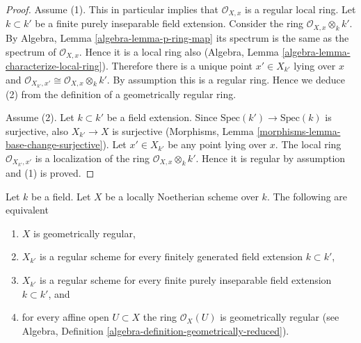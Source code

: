 \begin{proof}
Assume (1). This in particular implies that $\mathcal{O}_{X, x}$
is a regular local ring. Let $k \subset k'$ be a finite purely inseparable
field extension. Consider the ring $\mathcal{O}_{X, x} \otimes_k k'$.
By Algebra, Lemma \ref{algebra-lemma-p-ring-map}
its spectrum is the same as the spectrum of $\mathcal{O}_{X, x}$.
Hence it is a local ring also
(Algebra, Lemma \ref{algebra-lemma-characterize-local-ring}).
Therefore there is a unique point $x' \in X_{k'}$ lying over $x$
and $\mathcal{O}_{X_{k'}, x'} \cong \mathcal{O}_{X, x} \otimes_k k'$.
By assumption this is a regular ring. Hence we deduce (2)
from the definition of a geometrically regular ring.

\medskip\noindent
Assume (2). Let $k \subset k'$ be a field extension. Since
$\text{Spec}(k') \to \text{Spec}(k)$ is surjective, also
$X_{k'} \to X$ is surjective
(Morphisms, Lemma \ref{morphisms-lemma-base-change-surjective}).
Let $x' \in X_{k'}$ be any point lying over $x$.
The local ring $\mathcal{O}_{X_{k'}, x'}$
is a localization of the ring $\mathcal{O}_{X, x} \otimes_k k'$.
Hence it is regular by assumption and (1) is proved.
\end{proof}

\begin{lemma}
\label{lemma-geometrically-regular}
Let $k$ be a field.
Let $X$ be a locally Noetherian scheme over $k$.
The following are equivalent
\begin{enumerate}
\item $X$ is geometrically regular,
\item $X_{k'}$ is a regular scheme for every finitely generated field
extension $k \subset k'$,
\item $X_{k'}$ is a regular scheme for every finite purely inseparable
field extension $k \subset k'$, and
\item for every affine open $U \subset X$ the ring $\mathcal{O}_X(U)$
is geometrically regular (see
Algebra, Definition \ref{algebra-definition-geometrically-reduced}).
\end{enumerate}
\end{lemma}

